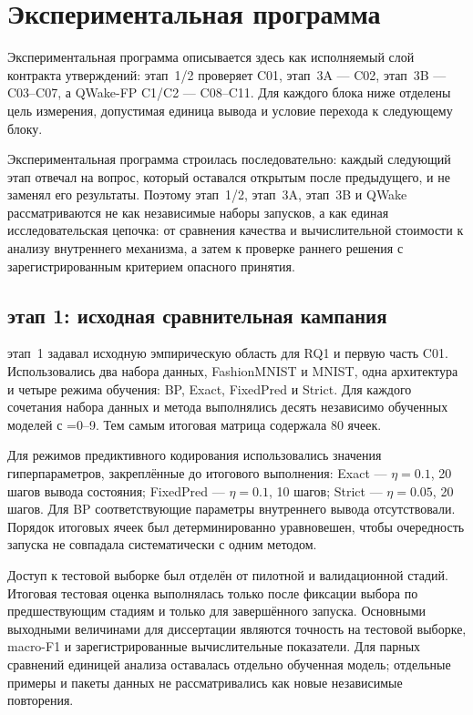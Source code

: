 \chapter{Экспериментальная программа}
\label{ch:experiments}

Экспериментальная программа описывается здесь как исполняемый слой контракта
утверждений: этап~1/2 проверяет C01, этап~3A --- C02, этап~3B --- C03--C07, а
QWake-FP C1/C2 --- C08--C11. Для каждого блока ниже отделены цель измерения,
допустимая единица вывода и условие перехода к следующему блоку.

Экспериментальная программа строилась последовательно: каждый следующий этап
отвечал на вопрос, который оставался открытым после предыдущего, и не заменял
его результаты. Поэтому этап~1/2, этап~3A, этап~3B и QWake рассматриваются
не как независимые наборы запусков, а как единая исследовательская цепочка: от
сравнения качества и вычислительной стоимости к анализу внутреннего механизма,
а затем к проверке раннего решения с зарегистрированным критерием опасного принятия.



\section{этап 1: исходная сравнительная кампания}
\label{sec:stage1-experiment}

этап~1 задавал исходную эмпирическую область для RQ1 и первую часть C01.
Использовались два
набора данных, FashionMNIST и MNIST, одна архитектура  и
четыре режима обучения: BP, Exact, FixedPred и Strict. Для каждого сочетания
набора данных и метода выполнялись десять независимо обученных моделей с
=0--9. Тем самым итоговая матрица содержала 80 ячеек.

Для режимов предиктивного кодирования использовались значения гиперпараметров,
закреплённые до итогового выполнения: Exact --- $\eta=0.1$, 20 шагов вывода
состояния; FixedPred --- $\eta=0.1$, 10 шагов; Strict --- $\eta=0.05$, 20
шагов. Для BP соответствующие параметры внутреннего вывода отсутствовали.
Порядок итоговых ячеек был детерминированно уравновешен, чтобы очередность
запуска не совпадала систематически с одним методом.

Доступ к тестовой выборке был отделён от пилотной и валидационной стадий.
Итоговая тестовая оценка выполнялась только после фиксации выбора по
предшествующим стадиям и только для завершённого запуска. Основными выходными
величинами для диссертации являются точность на тестовой выборке, macro-F1 и
зарегистрированные вычислительные показатели. Для парных сравнений единицей
анализа оставалась отдельно обученная модель; отдельные примеры и пакеты данных
не рассматривались как новые независимые повторения.

